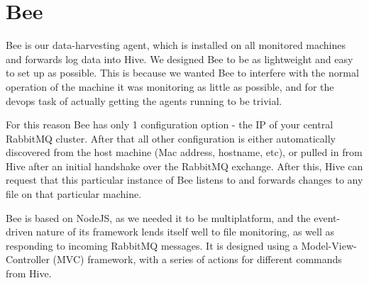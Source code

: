 \section{Bee}

Bee is our data-harvesting agent, which is installed on all monitored machines
and forwards log data into Hive. We designed Bee to be as lightweight and easy
to set up as possible. This is because we wanted Bee to interfere with the
normal operation of the machine it was monitoring as little as possible, and
for the devops task of actually getting the agents running to be trivial.

For this reason Bee has only 1 configuration option - the IP of your central
RabbitMQ cluster. After that all other configuration is either automatically
discovered from the host machine (Mac address, hostname, etc), or pulled in
from Hive after an initial handshake over the RabbitMQ exchange. After this,
Hive can request that this particular instance of Bee listens to and forwards
changes to any file on that particular machine.

Bee is based on NodeJS, as we needed it to be multiplatform, and the
event-driven nature of its framework lends itself well to file monitoring, as
well as responding to incoming RabbitMQ messages. It is designed using a
Model-View-Controller (MVC) framework, with a series of actions for different
commands from Hive.
